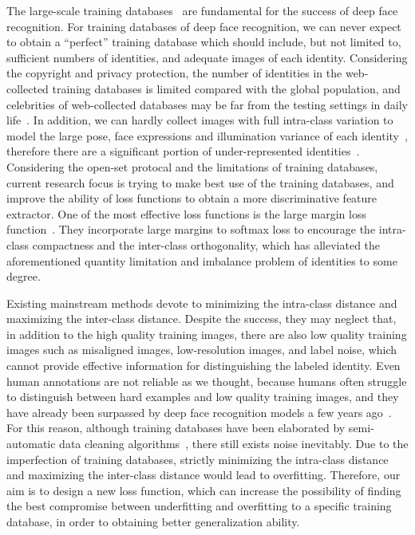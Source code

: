 \documentclass[journal,comsoc]{IEEEtran}
\begin{document}
The large-scale training databases~\cite{Yi2014CASIA,guo2016msceleb,nech2017level,Cao18,wang2018devil} are fundamental for the success of deep face recognition. For training databases of deep face recognition, we can never expect to obtain a ``perfect'' training database which should include, but not limited to, sufficient numbers of identities, and adequate images of each identity. Considering the copyright and privacy protection, the number of identities in the web-collected training databases is limited compared with the global population, and celebrities of web-collected databases may be far from the testing settings in daily life~\cite{zhou2015naive}. In addition, we can hardly collect images with full intra-class variation to model the large pose, face expressions and illumination variance of each identity~\cite{deng2017fine,maze2018iarpa}, therefore there are a significant portion of under-represented identities~\cite{Zhang2017rangeloss,yin2019feature,liu2019adaptiveface,zhong2019unequal}. Considering the open-set protocal and the limitations of training databases, current research focus is trying to make best use of the training databases, and improve the ability of loss functions to obtain a more discriminative feature extractor. One of the most effective loss functions is the large margin loss function~\cite{Liu2017SphereFace,Wang2018CosFace,deng2019arcface,zhang2019adacos,zhang2019p2sgrad}. They incorporate large margins to softmax loss to encourage the intra-class compactness and the inter-class orthogonality, which has alleviated the aforementioned quantity limitation and imbalance problem of identities to some degree.

Existing mainstream methods devote to minimizing the intra-class distance and maximizing the inter-class distance. Despite the success, they may neglect that, in addition to the high quality training images, there are also low quality training images such as misaligned images, low-resolution images, and label noise, which cannot provide effective information for distinguishing the labeled identity. Even human annotations are not reliable as we thought, because humans often struggle to distinguish between hard examples and low quality training images, and they have already been surpassed by deep face recognition models a few years ago~\cite{lu2015surpassing}. For this reason, although training databases have been elaborated by semi-automatic data cleaning algorithms~\cite{Yi2014CASIA,Cao18, wang2018devil,deng2019arcface}, there still exists noise inevitably. Due to the imperfection of training databases, strictly minimizing the intra-class distance and maximizing the inter-class distance would lead to overfitting. Therefore, our aim is to design a new loss function, which can increase the possibility of finding the best compromise between underfitting and overfitting to a specific training database, in order to obtaining better generalization ability. 
\end{document}
